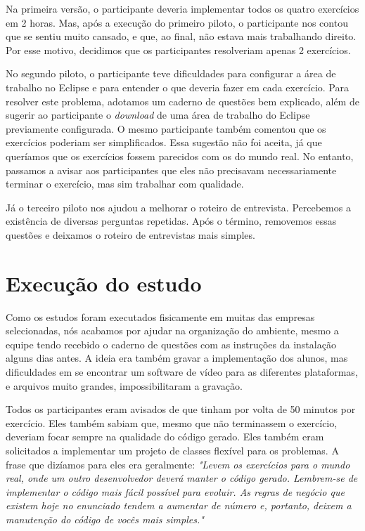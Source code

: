 Na primeira versão, o participante deveria implementar todos os quatro exercícios em 2 horas.
Mas, após a execução do primeiro piloto, o participante nos contou que se sentiu muito cansado, e
que, ao final, não estava mais trabalhando direito. Por esse motivo, decidimos que
os participantes resolveriam apenas 2 exercícios.

No segundo piloto, o participante teve dificuldades para configurar a área de trabalho no Eclipse e
para entender o que deveria fazer em cada exercício. Para resolver este problema, adotamos um 
caderno de questões bem explicado, além de sugerir ao participante o \textit{download} de uma
área de trabalho do Eclipse previamente configurada.
O mesmo participante também comentou que os exercícios poderiam ser simplificados. Essa sugestão
não foi aceita, já que queríamos que os exercícios fossem parecidos com os do mundo real. No entanto,
passamos a avisar aos participantes que eles não precisavam necessariamente terminar o exercício,
mas sim trabalhar com qualidade.

Já o terceiro piloto nos ajudou a melhorar o roteiro de entrevista. Percebemos a existência de diversas perguntas
repetidas. Após o término, removemos essas questões e deixamos o roteiro de entrevistas mais simples.

\section{Execução do estudo}
\label{subsec:particularidades-execucao}

Como os estudos foram executados fisicamente em muitas das empresas selecionadas,
nós acabamos por ajudar na organização do ambiente, mesmo a equipe tendo 
recebido o caderno de questões com as instruções da instalação
alguns dias antes. A ideia era também gravar a implementação dos alunos,
mas dificuldades em se encontrar um software de vídeo para as diferentes
plataformas, e arquivos muito grandes, impossibilitaram a gravação.

Todos os participantes eram avisados de que tinham por volta de 50 minutos
por exercício. Eles também sabiam que, mesmo que não terminassem o exercício,
deveriam focar sempre na qualidade do código gerado. Eles também eram solicitados
a implementar um projeto de classes flexível para os problemas. A frase que dizíamos para
eles era geralmente: \textit{"Levem os exercícios para o mundo real, onde um outro
desenvolvedor deverá manter o código gerado. Lembrem-se de implementar o código mais fácil possível
para evoluir. As regras de negócio que existem hoje no enunciado tendem a aumentar
de número e, portanto, deixem a manutenção do código de vocês mais simples."}

